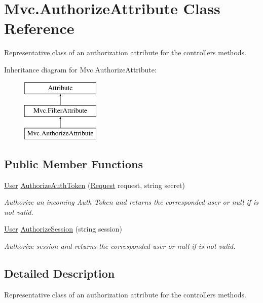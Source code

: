 \hypertarget{class_mvc_1_1_authorize_attribute}{}\section{Mvc.\+Authorize\+Attribute Class Reference}
\label{class_mvc_1_1_authorize_attribute}


Representative class of an authorization attribute for the controllers methods.  


Inheritance diagram for Mvc.\+Authorize\+Attribute\+:\begin{figure}[H]
\begin{center}
\leavevmode
\includegraphics[height=3.000000cm]{class_mvc_1_1_authorize_attribute}
\end{center}
\end{figure}
\subsection*{Public Member Functions}
\begin{DoxyCompactItemize}
\item 
\hyperlink{class_mvc_1_1_user}{User} \hyperlink{class_mvc_1_1_authorize_attribute_a6e307e8177daede23e820c499990cf69}{Authorize\+Auth\+Token} (\hyperlink{class_mvc_1_1_request}{Request} request, string secret)
\begin{DoxyCompactList}\small\item\em Authorize an incoming Auth Token and returns the corresponded user or null if is not valid. \end{DoxyCompactList}\item 
\hyperlink{class_mvc_1_1_user}{User} \hyperlink{class_mvc_1_1_authorize_attribute_aad3c74835450cca65e86f79aca028de4}{Authorize\+Session} (string session)
\begin{DoxyCompactList}\small\item\em Authorize session and returns the corresponded user or null if is not valid. \end{DoxyCompactList}\end{DoxyCompactItemize}


\subsection{Detailed Description}
Representative class of an authorization attribute for the controllers methods. 



